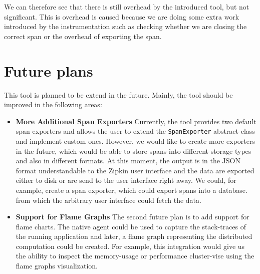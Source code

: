 We can therefore see that there is still overhead by the introduced tool, but not significant. This is overhead is caused because we are doing some extra work introduced by the instrumentation such as checking whether we are closing the correct span or the overhead of exporting the span.
\section{Future plans}
This tool is planned to be extend in the future. Mainly, the tool should be improved in the following areas:
\begin{itemize}
\item \textbf{More Additional Span Exporters} \newline
Currently, the tool provides two default span exporters and allows the user to extend the \texttt{SpanExporter} abstract class and implement custom ones. However, we would like to create more exporters in the future, which would be able to store spans into different storage types and also in different formats. At this moment, the output is in the JSON format understandable to the Zipkin user interface and the data are exported either to disk or are send to the user interface right away. We could, for example, create a span exporter, which could export spans into a database. from which the arbitrary user interface could fetch the data.
\item \textbf{Support for Flame Graphs} \newline
The second future plan is to add support for flame charts. The native agent could be used to capture the stack-traces of the running application and later, a flame graph representing the distributed computation could be created. For example, this integration would give us the ability to inspect the memory-usage or performance cluster-vise using the flame graphs visualization.
\end{itemize}



